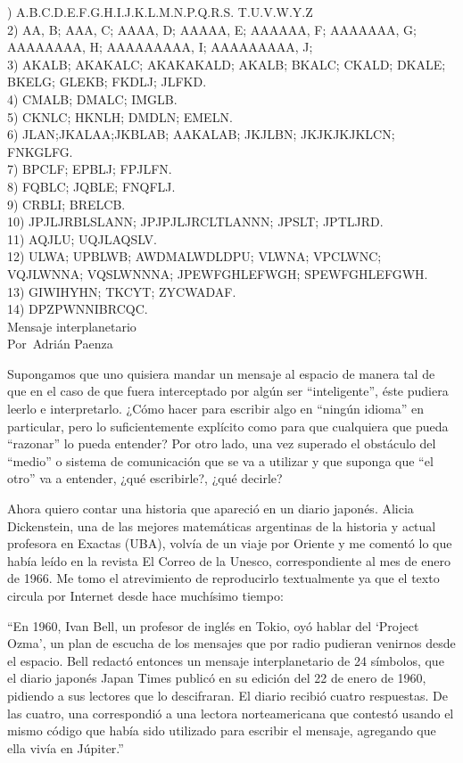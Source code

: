 \begin{parchment} {
) A.B.C.D.E.F.G.H.I.J.K.L.M.N.P.Q.R.S. T.U.V.W.Y.Z\\
2) AA, B; AAA, C; AAAA, D; AAAAA, E; AAAAAA, F; AAAAAAA, G; AAAAAAAA, H; AAAAAAAAA, I; AAAAAAAAA, J;\\
3) AKALB; AKAKALC; AKAKAKALD; AKALB; BKALC; CKALD; DKALE; BKELG; GLEKB; FKDLJ; JLFKD.\\
4) CMALB; DMALC; IMGLB.\\
5) CKNLC; HKNLH; DMDLN; EMELN.\\
6) JLAN;JKALAA;JKBLAB; AAKALAB; JKJLBN; JKJKJKJKLCN; FNKGLFG.\\
7) BPCLF; EPBLJ; FPJLFN.\\
8) FQBLC; JQBLE; FNQFLJ.\\
9) CRBLI; BRELCB.\\
10) JPJLJRBLSLANN; JPJPJLJRCLTLANNN; JPSLT; JPTLJRD.\\
11) AQJLU; UQJLAQSLV.\\
12) ULWA; UPBLWB; AWDMALWDLDPU; VLWNA; VPCLWNC; VQJLWNNA; VQSLWNNNA; JPEWFGHLEFWGH; SPEWFGHLEFGWH.\\
13) GIWIHYHN; TKCYT; ZYCWADAF.\\
14) DPZPWNNIBRCQC.\\
Mensaje interplanetario\\
Por Adrián Paenza

\bigskip


Supongamos que uno quisiera mandar un mensaje al espacio de manera tal de que en el caso de que fuera interceptado por algún ser “inteligente”, éste pudiera leerlo e interpretarlo. ¿Cómo hacer para escribir algo en “ningún idioma” en particular, pero lo suficientemente explícito como para que cualquiera que pueda “razonar” lo pueda entender?
Por otro lado, una vez superado el obstáculo del “medio” o sistema de comunicación que se va a utilizar y que suponga que “el otro” va a entender, ¿qué escribirle?, ¿qué decirle?

Ahora quiero contar una historia que apareció en un diario japonés. Alicia Dickenstein, una de las mejores matemáticas argentinas de la historia y actual profesora en Exactas (UBA), volvía de un viaje por Oriente y me comentó lo que había leído en la revista El Correo de la Unesco, correspondiente al mes de enero de 1966. Me tomo el atrevimiento de reproducirlo textualmente ya que el texto circula por Internet desde hace muchísimo tiempo:

“En 1960, Ivan Bell, un profesor de inglés en Tokio, oyó hablar del ‘Project Ozma’, un plan de escucha de los mensajes que por radio pudieran venirnos desde el espacio. Bell redactó entonces un mensaje interplanetario de 24 símbolos, que el diario japonés Japan Times publicó en su edición del 22 de enero de 1960, pidiendo a sus lectores que lo descifraran. El diario recibió cuatro respuestas. De las cuatro, una correspondió a una lectora norteamericana que contestó usando el mismo código que había sido utilizado para escribir el mensaje, agregando que ella vivía en Júpiter.”

}
\end{parchment}
